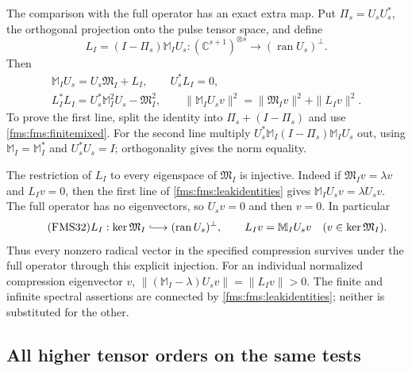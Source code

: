 \documentclass[11pt,a4paper]{article}
\theoremstyle{definition}\newtheorem{definition}[theorem]{Definition}
\newcommand{\C}{\mathbb C}\newcommand{\R}{\mathbb R}
\begin{document}
The comparison with the full operator has an exact extra map.
Put $\Pi_s=U_sU_s^*$, the orthogonal projection onto the pulse
tensor space, and define
\begin{equation}\tag{FMS30}\label{fms:fms:leakage}
 L_I=(I-\Pi_s)\mathbb M_IU_s:
       (\C^{s+1})^{\otimes s}\longrightarrow
       (\operatorname{ran}U_s)^\perp.
\end{equation}
Then
\begin{equation}\tag{FMS31}\label{fms:fms:leakidentities}
 \begin{gathered}
 \mathbb M_IU_s=U_s\mathfrak M_I+L_I,\qquad U_s^*L_I=0,\\
 L_I^*L_I=U_s^*\mathbb M_I^2U_s-\mathfrak M_I^2,\qquad
 \|\mathbb M_IU_sv\|^2
       =\|\mathfrak M_Iv\|^2+\|L_Iv\|^2.
 \end{gathered}
\end{equation}
To prove the first line, split the identity into $\Pi_s+(I-\Pi_s)$
and use \eqref{fms:fms:finitemixed}. For the second line multiply
$U_s^*\mathbb M_I(I-\Pi_s)\mathbb M_IU_s$ out, using
$\mathbb M_I=\mathbb M_I^*$ and $U_s^*U_s=I$; orthogonality
gives the norm equality.

The restriction of $L_I$ to every eigenspace of
$\mathfrak M_I$ is injective. Indeed if
$\mathfrak M_Iv=\lambda v$ and $L_Iv=0$, then the first line
of \eqref{fms:fms:leakidentities} gives
$\mathbb M_IU_sv=\lambda U_sv$. The full operator has no
eigenvectors, so $U_sv=0$ and then $v=0$. In particular
\begin{equation}\tag{FMS32}\label{fms:fms:radicalmap}
 L_I:\ker\mathfrak M_I\lhook\joinrel\longrightarrow
       (\operatorname{ran}U_s)^\perp,\qquad
 L_Iv=\mathbb M_IU_sv\quad(v\in\ker\mathfrak M_I).
\end{equation}
Thus every nonzero radical vector in the specified compression
survives under the full operator through this explicit injection.
For an individual normalized compression eigenvector $v$,
$\|(\mathbb M_I-\lambda)U_sv\|=\|L_Iv\|>0$.
The finite and infinite spectral assertions are connected by
\eqref{fms:fms:leakidentities}; neither is substituted for the other.

\subsection{All higher tensor orders on the same tests}
\end{document}
